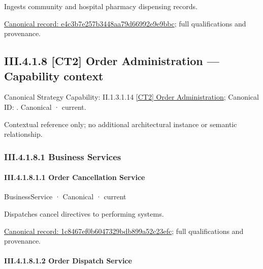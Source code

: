 Ingests community and hospital pharmacy dispensing records.


{\footnotesize \href{../../../../continuum/business/business-function/e4c3b7e257b3448aa79d66992e9e9bbc.md}{Canonical record: e4c3b7e257b3448aa79d66992e9e9bbc}; full qualifications and provenance.}\par
\subsection*{III.4.1.8 [CT2] Order Administration — Capability context}
\label{navigation:III.4.1.8}

{\small Canonical Strategy Capability: II.1.3.1.14 \hyperref[element:c3c5abd7987f4433a46cbfed8167914c]{[CT2] Order Administration}; Canonical ID: \texttt{}. Canonical · current.}\par
Contextual reference only; no additional architectural instance or semantic relationship.\par
\subsubsection*{III.4.1.8.1 Business Services}
\label{navigation:III.4.1.8.1}

\paragraph*{III.4.1.8.1.1 Order Cancellation Service}
\label{navigation:III.4.1.8.1.1}

\label{element:1c8467ef0b6047329bdb899a52c23efc}
{\small BusinessService · Canonical · current}\par

Dispatches cancel directives to performing systems.


{\footnotesize \href{../../../../continuum/business/business-service/1c8467ef0b6047329bdb899a52c23efc.md}{Canonical record: 1c8467ef0b6047329bdb899a52c23efc}; full qualifications and provenance.}\par
\paragraph*{III.4.1.8.1.2 Order Dispatch Service}
\label{navigation:III.4.1.8.1.2}

